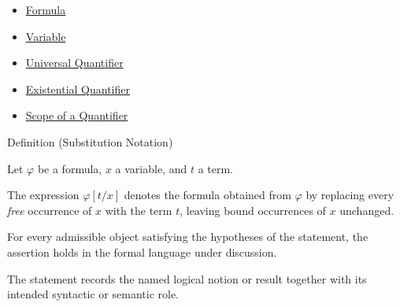 
\begin{dependencies}
\begin{itemize}
  \item \hyperref[def:formula]{Formula}
  \item \hyperref[def:variable]{Variable}
  \item \hyperref[def:universal-q]{Universal Quantifier}
  \item \hyperref[def:existential-q]{Existential Quantifier}
  \item \hyperref[def:scope]{Scope of a Quantifier}
\end{itemize}
\end{dependencies}

\begin{definitionbox}{Definition (Substitution Notation)}
\begin{definition}
\label{def:subst-notation}
Let $\varphi$ be a formula, $x$ a variable, and $t$ a term.

The expression $\varphi[t/x]$ denotes the formula obtained from $\varphi$ by
replacing every \emph{free} occurrence of $x$ with the term $t$, leaving bound
occurrences of $x$ unchanged.
\end{definition}
\end{definitionbox}
\begin{remark*}
For every admissible object satisfying the hypotheses of the statement, the
assertion holds in the formal language under discussion.
\end{remark*}

\begin{remark*}[Interpretation]
The statement records the named logical notion or result together with its
intended syntactic or semantic role.
\end{remark*}


